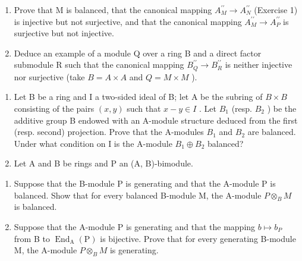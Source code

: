 \begin{enumerate}
\def\labelenumi{\alph{enumi})}
\item
  Prove that M is balanced, that the canonical mapping \(A_{M}^{\prime\prime} \rightarrow A_{N}^{\prime\prime}\) (Exercise 1) is injective but not surjective, and that the canonical mapping \(A_{M}^{\prime\prime} \rightarrow A_{P}^{\prime\prime}\) is surjective but not injective.
\item
  Deduce an example of a module Q over a ring B and a direct factor submodule R such that the canonical mapping \(B_{Q}^{\prime\prime} \rightarrow B_{R}^{\prime\prime}\) is neither injective nor surjective (take \(B = A \times A\) and \(Q = M \times M\) ).
\end{enumerate}

\begin{enumerate}
\def\labelenumi{\arabic{enumi})}
\setcounter{enumi}{2}
\item
  Let B be a ring and I a two-sided ideal of B; let A be the subring of \(B \times B\) consisting of the pairs \((x, y)\) such that \(x - y \in I\) . Let \(B_{1}\) (resp. \(B_{2}\) ) be the additive group B endowed with an A-module structure deduced from the first (resp. second) projection. Prove that the A-modules \(B_{1}\) and \(B_{2}\) are balanced. Under what condition on I is the A-module \(B_{1} \oplus B_{2}\) balanced?
\item
  Let A and B be rings and P an (A, B)-bimodule.
\end{enumerate}

\begin{enumerate}
\def\labelenumi{\alph{enumi})}
\item
  Suppose that the B-module P is generating and that the A-module P is balanced. Show that for every balanced B-module M, the A-module \(P \otimes_{B} M\) is balanced.
\item
  Suppose that the A-module P is generating and that the mapping \(b \mapsto b_{P}\) from B to \(\operatorname{End}_{\mathrm{A}}(\mathrm{P})\) is bijective. Prove that for every generating B-module M, the A-module \(P \otimes_{B} M\) is generating.
\end{enumerate}

